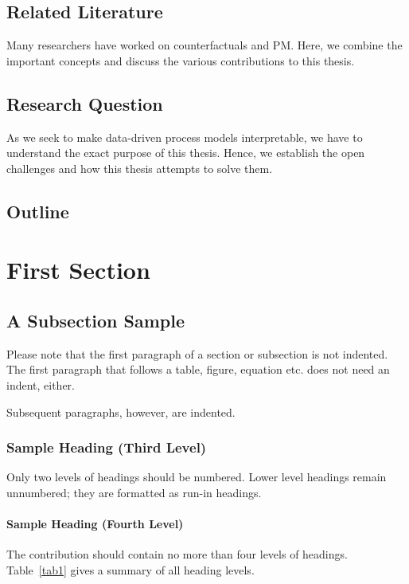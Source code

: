 \documentclass[runningheads]{llncs}
\begin{document}
\subsection{Related Literature}
\label{sec:literature}
Many researchers have worked on counterfactuals and \Gls{PM}. 
Here, we combine the important concepts and discuss the various contributions to this thesis.
% 


\subsection{Research Question}
\label{sec:rq}
As we seek to make data-driven process models interpretable, we have to understand the exact purpose of this thesis. Hence, we establish the open challenges and how this thesis attempts to solve them. 
% 

\subsection{Outline}
% 




\section{First Section}
\subsection{A Subsection Sample}
Please note that the first paragraph of a section or subsection is
not indented. The first paragraph that follows a table, figure,
equation etc. does not need an indent, either.

Subsequent paragraphs, however, are indented.

\subsubsection{Sample Heading (Third Level)} Only two levels of
headings should be numbered. Lower level headings remain unnumbered;
they are formatted as run-in headings.

\paragraph{Sample Heading (Fourth Level)}
The contribution should contain no more than four levels of
headings. Table~\ref{tab1} gives a summary of all heading levels.
\end{document}
